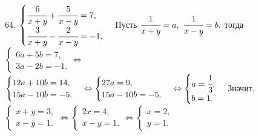 64. $\begin{cases} \cfrac{6}{x+y}+\cfrac{5}{x-y}=7,\\ \cfrac{3}{x+y}-\cfrac{2}{x-y}=-1.\end{cases}$ Пусть $\cfrac{1}{x+y}=a,\ \cfrac{1}{x-y}=b,$ тогда
$\begin{cases} 6a+5b=7,\\ 3a-2b=-1.\end{cases}\Leftrightarrow$\\$ \begin{cases} 12a+10b=14,\\ 15a-10b=-5.\end{cases}\Leftrightarrow
\begin{cases} 27a=9,\\ 15a-10b=-5.\end{cases}\Leftrightarrow \begin{cases} a=\cfrac{1}{3},\\ b=1.\end{cases}$ Значит,
$\begin{cases} x+y=3,\\ x-y=1.\end{cases}\Leftrightarrow\begin{cases} 2x=4,\\ x-y=1.\end{cases}\Leftrightarrow\begin{cases} x=2,\\ y=1.\end{cases}$\\
